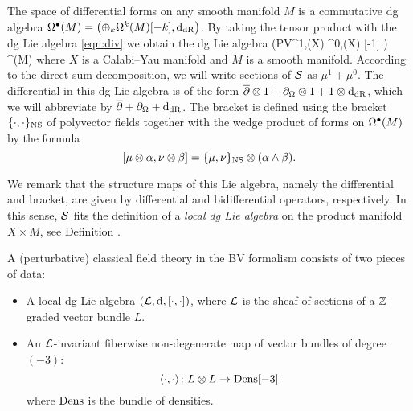 \documentclass[11pt]{amsart}
\def\pv{{\rm PV}}
\def\PV{{\rm PV}}
\begin{document}

The space of differential forms on any smooth manifold $M$ is a commutative dg algebra $\Omega^{\bullet}(M) = \left(\oplus_{k}\Omega^{k}(M)[-k], {\rm d}_{{\rm dR}}\right)$.
By taking the tensor product with the dg Lie algebra \eqref{eqn:div} we obtain the dg Lie algebra
\beqn\label{localLie}
  \cS {} \left(\PV^{1,\bu}(X) \xto{\partial_\Omega} \Omega^{0,\bu}(X) [-1] \right) \; \Hat{\otimes} \; \Omega^{\bu}(M) 
\eeqn
where $X$ is a Calabi--Yau manifold and $M$ is a smooth manifold.
According to the direct sum decomposition, we will write sections of $\mathcal S$ as $\mu^1 +\mu^0$. 
The differential in this dg Lie algebra is of the form $\overline{\partial} \otimes 1 + \partial_\Omega \otimes 1 + 1 \otimes {\rm d}_{\rm dR}$, which we will abbreviate by $\overline{\partial} + \partial_\Omega + {\rm d}_{\rm dR}$.
The bracket is defined using the bracket $\{\cdot,\cdot\}_{\rm NS}$ of polyvector fields together with the wedge product of forms on $\Omega^\bullet(M)$ by the formula
\[
  [\mu \otimes \alpha, \nu \otimes \beta] = \{\mu, \nu\}_{\rm NS} \otimes (\alpha \wedge \beta) .
\]

We remark that the structure maps of this Lie algebra, namely the differential and bracket, are given by differential and bidifferential operators, respectively.
In this sense, $\mathcal S$ fits the definition of a {\em local dg Lie algebra} on the product manifold $X \times M$, see Definition \cite[??]{CG2}.

\begin{lem}
A (perturbative) classical field theory in the BV formalism consists of two pieces of data:
\begin{itemize}
\item A local dg Lie algebra $(\mathcal L, {\rm d}, [\cdot, \cdot])$, where $\mathcal L$ is the sheaf of sections of a $\mathbb Z$-graded vector bundle $L$.
\item An $\mathcal L$-invariant fiberwise non-degenerate map of vector bundles of degree $(-3)$:
\[
\langle \cdot , \cdot \rangle \colon L \otimes L \to {\rm Dens} [-3] 
\]
where ${\rm Dens}$ is the bundle of densities. 
\end{itemize}
\end{lem}
\end{document}

